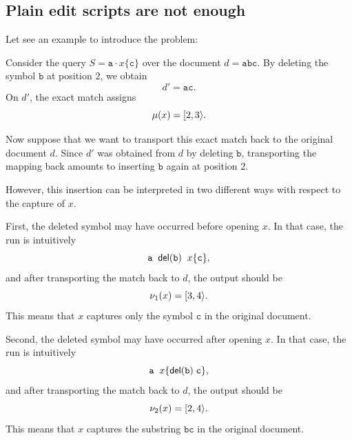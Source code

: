 


\subsection{Plain edit scripts are not enough}

Let see an example to introduce the problem:

\begin{example}
	Consider the query $S=\mathtt a\cdot x\{\mathtt c\}$
	over the document $d=\mathtt{abc}.$
	By deleting the symbol \(\mathtt b\) at position \(2\), we obtain
	\[
	d'=\mathtt{ac}.
	\]
	On \(d'\), the exact match assigns
	\[
	\mu(x)=[2,3\rangle.
	\]
	
	Now suppose that we want to transport this exact match back to the original
	document \(d\). Since \(d'\) was obtained from \(d\) by deleting
	\(\mathtt b\), transporting the mapping back amounts to inserting
	\(\mathtt b\) again at position \(2\).
	
	However, this insertion can be interpreted in two different ways with
	respect to the capture of \(x\).
	
	First, the deleted symbol may have occurred before opening \(x\). In that
	case, the run is intuitively
	\[
	\mathtt a\;\; \mathsf{del}(\mathtt b)\;\; x\{\mathtt c\},
	\]
	and after transporting the match back to \(d\), the output should be
	\[
	\nu_1(x)=[3,4\rangle.
	\]
	This means that \(x\) captures only the symbol \(\mathtt c\) in the original
	document.
	
	Second, the deleted symbol may have occurred after opening \(x\). In that
	case, the run is intuitively
	\[
	\mathtt a\;\; x\{\mathsf{del}(\mathtt b)\;\mathtt c\},
	\]
	and after transporting the match back to \(d\), the output should be
	\[
	\nu_2(x)=[2,4\rangle.
	\]
	This means that \(x\) captures the substring \(\mathtt{bc}\) in the original
	document.
	
\end{example}


